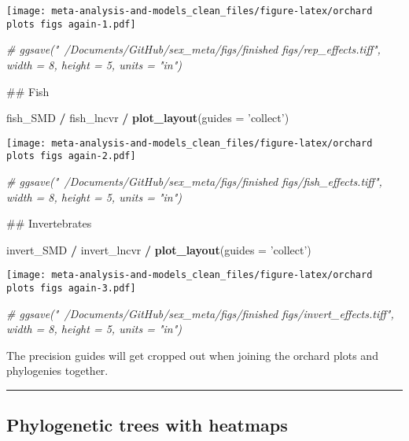 \documentclass[]{article}
\newenvironment{Shaded}{\begin{snugshade}}{\end{snugshade}}
\newcommand{\KeywordTok}[1]{\textcolor[rgb]{0.13,0.29,0.53}{\textbf{#1}}}
\newcommand{\DataTypeTok}[1]{\textcolor[rgb]{0.13,0.29,0.53}{#1}}
\newcommand{\StringTok}[1]{\textcolor[rgb]{0.31,0.60,0.02}{#1}}
\newcommand{\CommentTok}[1]{\textcolor[rgb]{0.56,0.35,0.01}{\textit{#1}}}
\newcommand{\OperatorTok}[1]{\textcolor[rgb]{0.81,0.36,0.00}{\textbf{#1}}}
\newcommand{\NormalTok}[1]{#1}
\begin{document}
\texttt{[image: meta-analysis-and-models\_clean\_files/figure-latex/orchard plots figs again-1.pdf]}

\begin{Shaded}
\begin{Highlighting}[]
\CommentTok{# ggsave("~/Documents/GitHub/sex_meta/figs/finished figs/rep_effects.tiff", width = 8, height = 5, units = "in")}

\NormalTok{## Fish}

\NormalTok{fish_SMD }\OperatorTok{/}\StringTok{ }\NormalTok{fish_lncvr }\OperatorTok{/}\StringTok{ }\KeywordTok{plot_layout}\NormalTok{(}\DataTypeTok{guides =} \StringTok{'collect'}\NormalTok{)}
\end{Highlighting}
\end{Shaded}

\texttt{[image: meta-analysis-and-models\_clean\_files/figure-latex/orchard plots figs again-2.pdf]}

\begin{Shaded}
\begin{Highlighting}[]
\CommentTok{# ggsave("~/Documents/GitHub/sex_meta/figs/finished figs/fish_effects.tiff", width = 8, height = 5, units = "in")}

\NormalTok{## Invertebrates}

\NormalTok{invert_SMD }\OperatorTok{/}\StringTok{ }\NormalTok{invert_lncvr }\OperatorTok{/}\StringTok{ }\KeywordTok{plot_layout}\NormalTok{(}\DataTypeTok{guides =} \StringTok{'collect'}\NormalTok{)}
\end{Highlighting}
\end{Shaded}

\texttt{[image: meta-analysis-and-models\_clean\_files/figure-latex/orchard plots figs again-3.pdf]}

\begin{Shaded}
\begin{Highlighting}[]
\CommentTok{# ggsave("~/Documents/GitHub/sex_meta/figs/finished figs/invert_effects.tiff", width = 8, height = 5, units = "in")}
\end{Highlighting}
\end{Shaded}

The precision guides will get cropped out when joining the orchard plots
and phylogenies together.

\begin{center}\rule{0.5\linewidth}{0.5pt}\end{center}

\subsection{Phylogenetic trees with
heatmaps}\label{phylogenetic-trees-with-heatmaps}
\end{document}
